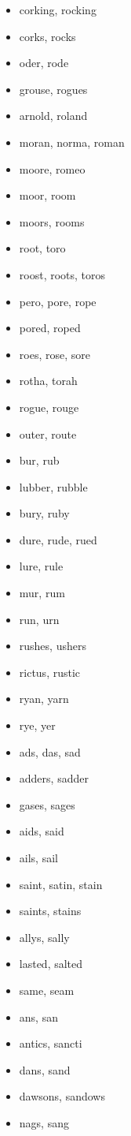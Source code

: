 \documentclass[a4wide,11pt]{report}
\begin{document}
\begin{itemize}
  \item corking, rocking
  \item corks, rocks
  \item oder, rode
  \item grouse, rogues
  \item arnold, roland
  \item moran, norma, roman
  \item moore, romeo
  \item moor, room
  \item moors, rooms
  \item root, toro
  \item roost, roots, toros
  \item pero, pore, rope
  \item pored, roped
  \item roes, rose, sore
  \item rotha, torah
  \item rogue, rouge
  \item outer, route
  \item bur, rub
  \item lubber, rubble
  \item bury, ruby
  \item dure, rude, rued
  \item lure, rule
  \item mur, rum
  \item run, urn
  \item rushes, ushers
  \item rictus, rustic
  \item ryan, yarn
  \item rye, yer
  \item ads, das, sad
  \item adders, sadder
  \item gases, sages
  \item aids, said
  \item ails, sail
  \item saint, satin, stain
  \item saints, stains
  \item allys, sally
  \item lasted, salted
  \item same, seam
  \item ans, san
  \item antics, sancti
  \item dans, sand
  \item dawsons, sandows
  \item nags, sang

\end{itemize}
\end{document}

